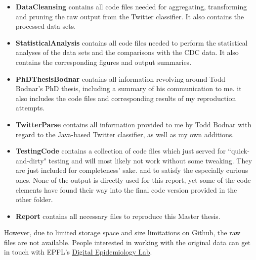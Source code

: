 \documentclass[11pt, a4paper,twoside]{report}\usepackage[]{graphicx}\usepackage[]{color}
\begin{document}
\begin{itemize}
  \item \textbf{DataCleansing} contains all code files needed for aggregating, transforming and pruning the raw output from the Twitter classifier. It also contains the processed data sets. 
  \item \textbf{StatisticalAnalysis} contains all code files needed to perform the statistical analyses of the data sets and the comparisons with the CDC data. It also contains the corresponding figures and output summaries.
   \item \textbf{PhDThesisBodnar} contains all information revolving around Todd Bodnar's PhD thesis, including a summary of his communication to me. it also includes the code files and corresponding results of my reproduction attempts.
   \item \textbf{TwitterParse} contains all information provided to me by Todd Bodnar with regard to the Java-based Twitter classifier, as well as my own additions.
  \item \textbf{TestingCode} contains a collection of code files which just served for ``quick-and-dirty" testing and will most likely not work without some tweaking. They are just included for completeness' sake. and to satisfy the especially curious ones. None of the output is directly used for this report, yet some of the code elements have found their way into the final code version provided in the other folder.
  \item \textbf{Report} contains all necessary files to reproduce this Master thesis.
\end{itemize}

However, due to limited storage space and size limitations on Github, the raw files are not available. People interested in working with the original data can get in touch with EPFL's \href{https://www.digitalepidemiologylab.org/}{Digital Epidemiology Lab}.
\end{document}
